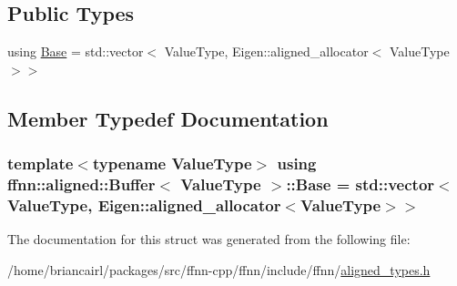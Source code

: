 \subsection*{Public Types}
\begin{DoxyCompactItemize}
\item 
using \hyperlink{structffnn_1_1aligned_1_1_buffer_af6851eeb6c392f2ecf7ad9e74fa0b650}{Base} = std\-::vector$<$ Value\-Type, Eigen\-::aligned\-\_\-allocator$<$ Value\-Type $>$$>$
\end{DoxyCompactItemize}


\subsection{Member Typedef Documentation}
\hypertarget{structffnn_1_1aligned_1_1_buffer_af6851eeb6c392f2ecf7ad9e74fa0b650}{
\subsubsection[{Base}]{\setlength{\rightskip}{0pt plus 5cm}template$<$typename Value\-Type$>$ using {\bf ffnn\-::aligned\-::\-Buffer}$<$ Value\-Type $>$\-::{\bf Base} =  std\-::vector$<$Value\-Type, Eigen\-::aligned\-\_\-allocator$<$Value\-Type$>$$>$}}\label{structffnn_1_1aligned_1_1_buffer_af6851eeb6c392f2ecf7ad9e74fa0b650}


The documentation for this struct was generated from the following file\-:\begin{DoxyCompactItemize}
\item 
/home/briancairl/packages/src/ffnn-\/cpp/ffnn/include/ffnn/\hyperlink{aligned__types_8h}{aligned\-\_\-types.\-h}\end{DoxyCompactItemize}
